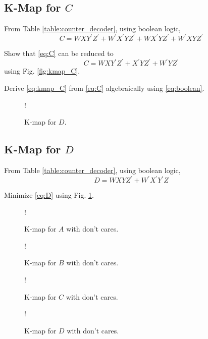 \documentclass[journal,12pt,twocolumn]{IEEEtran}
\begin{document}
\subsection{K-Map for $C$ }
From Table \ref{table:counter_decoder}, using boolean logic,
\begin{equation}
\label{eq:C}
C = WXY^{\prime}Z^{\prime} + W^{\prime}X^{\prime}YZ^{\prime}
+WX^{\prime}YZ^{\prime}
+W^{\prime}XYZ^{\prime}
\end{equation}
%
\begin{problem}
Show that \eqref{eq:C} can be reduced to
\begin{equation}
\label{eq:kmap_C}
C = WXY^{\prime}Z^{\prime}  +  X^{\prime}YZ^{\prime} + W^{\prime}YZ^{\prime}
\end{equation}
using Fig. \ref{fig:kmap_C}.
\end{problem}
\begin{problem}
Derive \eqref{eq:kmap_C} from \eqref{eq:C} algebraically using \eqref{eq:boolean}.
\end{problem}
%
\begin{figure}[!h]
\resizebox {\columnwidth} {!} {

}
\caption{K-map for $D$.}
\label{fig:kmap_D}
\end{figure}

\subsection{K-Map for $D$ }
From Table \ref{table:counter_decoder}, using boolean logic,
\begin{equation}
\label{eq:D}
D = WXYZ^{\prime} + W^{\prime}X^{\prime}Y^{\prime}Z
\end{equation}
%
\begin{problem}
Minimize \eqref{eq:D} using Fig. \ref{fig:kmap_D}.
\end{problem}

\begin{figure}[!h]
\resizebox {\columnwidth} {!} {

}
\caption{K-map for $A$ with don't cares.}
\label{fig:kmap_A_x}
\end{figure}
\begin{figure}[!h]
\resizebox {\columnwidth} {!} {

}
\caption{K-map for $B$ with don't cares.}
\label{fig:kmap_B_x}
\end{figure}
\begin{figure}[!h]
\resizebox {\columnwidth} {!} {

}
\caption{K-map for $C$ with don't cares.}
\label{fig:kmap_C_x}
\end{figure}
\begin{figure}[!h]
\resizebox {\columnwidth} {!} {

}
\caption{K-map for $D$ with don't cares.}
\label{fig:kmap_D_x}
\end{figure}
\end{document}
